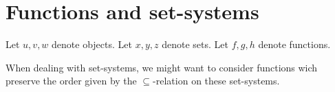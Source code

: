 \documentclass[../../set-theory.ftl.tex]{subfiles}
\begin{document}
  \begin{comment}
    \begin{forthel}

    \end{forthel}
  \end{comment}


  \section{Functions and set-systems}

  \begin{forthel}
  \end{forthel}

  \begin{forthel}
  \end{forthel}

  \begin{forthel}
    Let $u,v,w$ denote objects.
    Let $x,y,z$ denote sets.
    Let $f,g,h$ denote functions.
  \end{forthel}

  \noindent When dealing with set-systems, we might want to consider functions
  wich preserve the order given by the $\subseteq$-relation on these
  set-systems.
\end{document}
